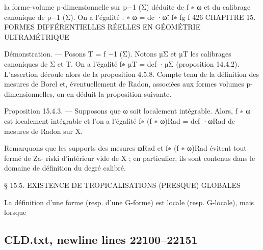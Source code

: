 \documentclass[
  10pt,
]{article}
\newenvironment{Shaded}{}{}
\newcommand{\NormalTok}[1]{#1}
\begin{document}
\begin{Shaded}
\begin{Highlighting}[]
\NormalTok{la forme{-}volume p{-}dimensionnelle sur p−1 (Σ) déduite de f ∗ ω et du calibrage canonique}
\NormalTok{de p−1 (Σ). On a l’égalité :}
\NormalTok{                                          ∗ ω = dc ·ω̃.}
\NormalTok{                                      f∗ fg       f}
\NormalTok{426 CHAPITRE 15. FORMES DIFFÉRENTIELLES RÉELLES EN GÉOMÉTRIE ULTRAMÉTRIQUE}

\NormalTok{Démonstration. — Posons T = f −1 (Σ). Notons µΣ et µT les calibrages canoniques de Σ}
\NormalTok{et T. On a l’égalité f∗ µT = dcf ·µΣ (proposition 14.4.2). L’assertion découle alors de la}
\NormalTok{proposition 4.5.8.}
\NormalTok{  Compte tenu de la définition des mesures de Borel et, éventuellement de Radon,}
\NormalTok{associées aux formes volumes p{-}dimensionnelles, on en déduit la proposition suivante.}

\NormalTok{Proposition 15.4.3. — Supposons que ω soit localement intégrable. Alors, f ∗ ω est}
\NormalTok{localement intégrable et l’on a l’égalité}
\NormalTok{                                    f∗ (f ∗ ω)Rad = dcf ·ωRad}
\NormalTok{de mesures de Radon sur X.}

\NormalTok{   Remarquons que les supports des mesures ωRad et f∗ (f ∗ ω)Rad évitent tout fermé de Za{-}}
\NormalTok{riski d’intérieur vide de X ; en particulier, ils sont contenus dans le domaine de définition}
\NormalTok{du degré calibré.}



\NormalTok{§ 15.5. EXISTENCE DE TROPICALISATIONS (PRESQUE) GLOBALES}

\NormalTok{   La définition d’une forme (resp. d’une G{-}forme) est locale (resp. G{-}locale), mais lorsque}
\end{Highlighting}
\end{Shaded}

\subsection{CLD.txt, newline lines
22100--22151}\label{cld.txt-newline-lines-2210022151}
\end{document}
